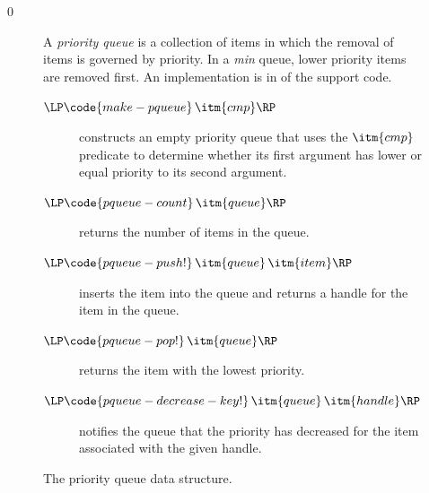 \documentclass[7x10]{TimesAPriori_MIT}%
\def\racketEd{0}
\providecommand{\BookEdition}{1}
\let\edition\BookEdition
\numberwithin{theorem}{chapter}
\numberwithin{definition}{chapter}
\numberwithin{equation}{chapter}
\begin{document}
{\if\edition\racketEd      
\begin{figure}[tp]
  \small
  \begin{tcolorbox}[title=Priority Queue]
    A \emph{priority queue}
    is a collection of items in which the
    removal of items is governed by priority. In a \emph{min} queue,
    lower priority items are removed first. An implementation is in
     of the support code.
  \begin{description}
  \item[$\LP\code{make-pqueue}\,\itm{cmp}\RP$] constructs an empty
    priority queue that uses the $\itm{cmp}$ predicate to determine
    whether its first argument has lower or equal priority to its
    second argument.
  \item[$\LP\code{pqueue-count}\,\itm{queue}\RP$] returns the number of
    items in the queue.
  \item[$\LP\code{pqueue-push!}\,\itm{queue}\,\itm{item}\RP$] inserts
    the item into the queue and returns a handle for the item in the
    queue.
  \item[$\LP\code{pqueue-pop!}\,\itm{queue}\RP$] returns the item with
    the lowest priority.
  \item[$\LP\code{pqueue-decrease-key!}\,\itm{queue}\,\itm{handle}\RP$]
    notifies the queue that the priority has decreased for the item
    associated with the given handle.
  \end{description}
\end{tcolorbox}
  \caption{The priority queue data structure.}
  \label{fig:priority-queue}
\end{figure}
\fi}
\end{document}
